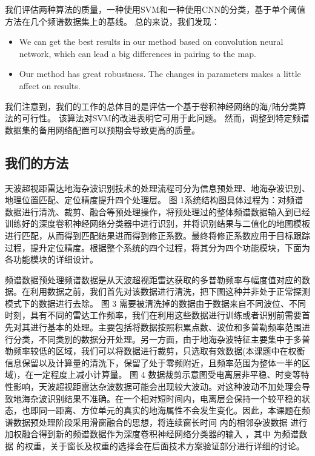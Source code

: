 
我们评估两种算法的质量，一种使用SVM和一种使用CNN的分类，基于单个阈值方法在几个频谱数据集上的基线。 总的来说，我们发现：

\begin{itemize}
	\item We can get the best results in our method based on convolution neural network, which can lead a big differences in pairing to the map.
	\item Our method has great robustness. The changes in parameters makes a little affect on results.
\end{itemize}

我们注意到，我们的工作的总体目的是评估一个基于卷积神经网络的海/陆分类算法的可行性。 该算法对SVM的改进表明它可用于此问题。 然而，调整到特定频谱数据集的备用网络配置可以预期会导致更高的质量。

\subsection{我们的方法}

天波超视距雷达地海杂波识别技术的处理流程可分为信息预处理、地海杂波识别、地理位置匹配、定位精度提升四个处理层。 图 1系统结构图具体过程为：对频谱数据进行清洗、裁剪、融合等预处理操作，将预处理过的整体频谱数据输入到已经训练好的深度卷积神经网络分类器中进行识别，并将识别结果与二值化的地图模板进行匹配，从而得到匹配结果进而得到修正系数。最终将修正系数应用于目标跟踪过程，提升定位精度。根据整个系统的四个过程，将其分为四个功能模块，下面为各功能模块的详细设计。

频谱数据预处理频谱数据是从天波超视距雷达获取的多普勒频率与幅度值对应的数据。在利用数据之前，我们首先对该数据进行清洗，把下图这种并非处于正常探测模式下的数据进行去除。 图 3 需要被清洗掉的数据由于数据来自不同波位、不同时刻，具有不同的雷达工作频率，我们在利用这些数据进行训练或者识别前需要首先对其进行基本的处理。主要包括将数据按照积累点数、波位和多普勒频率范围进行分类，不同类别的数据分开处理。另一方面，由于地海杂波特征主要集中于多普勒频率较低的区域，我们可以将数据进行裁剪，只选取有效数据(本课题中在权衡信息保留以及计算量的清洗下，保留了处于零频附近，且频率范围为整体一半的区域)，在一定程度上减小计算量。 图 4 数据裁剪示意图受电离层非平稳、时变等特性影响，天波超视距雷达杂波数据可能会出现较大波动。对这种波动不加处理会导致地海杂波识别结果不准确。在一个相对短时间内，电离层会保持一个较平稳的状态，也即同一距离、方位单元的真实的地海属性不会发生变化。因此，本课题在频谱数据预处理阶段采用滑窗融合的思想，将连续窗长时间 内的相邻杂波数据 进行加权融合得到新的频谱数据作为深度卷积神经网络分类器的输入 ，其中 为频谱数据 的权重，关于窗长及权重的选择会在后面技术方案验证部分进行详细的讨论。


